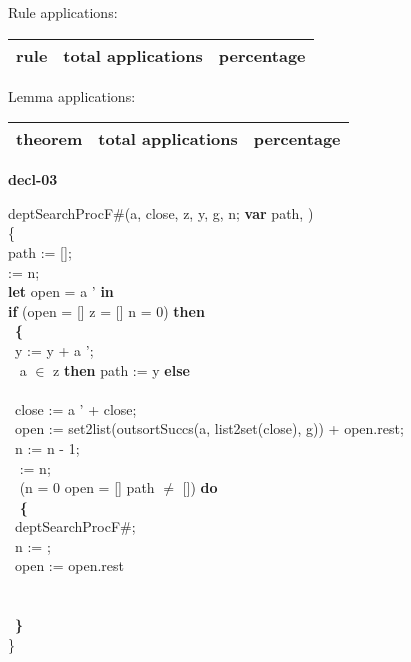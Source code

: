 \documentclass[a4paper]{article}
\begin{document}
Rule applications:

\begin{supertabular}{l|r|r}
rule	        & total applications & percentage \\ \hline

\end{supertabular}

Lemma applications:

\begin{supertabular}{l|r|r}
theorem	        & total applications & percentage \\ \hline

\end{supertabular}
\pagebreak

{\LARGE\bf decl-03}\label{lemma-decl-03}

\medskip

deptSearchProcF\#(a, close, z, y, g, n; {\bf var} path, ) \\
\{\\
path := [];\\
  := n;\\
 {\bf let} open = a ' {\bf in}\\
 {\bf if} \Not (open = [] \Or z = [] \Or n = 0) {\bf then}\\
 \tabif\  {\bf \{}\\
 \tabif\ \tabbe y := y + a ';\\
 \tabif\  a $\in$ z {\bf then} path := y {\bf else}\\
 \tabif\ \tabbe  {\bf \{}\\
 \tabif\ \tabbe \tabbe close := a ' + close;\\
 \tabif\ \tabbe \tabbe open := set2list(outsortSuccs(a, list2set(close), g)) + open.rest;\\
 \tabif\ \tabbe \tabbe n := n - 1;\\
 \tabif\ \tabbe \tabbe {} := n;\\
 \tabif\ \tabbe {} \Not (n = 0 \Or open = [] \Or path $\neq$ []) {\bf do}\\
 \tabif\ \tabbe \tabbe {} {\bf \{}\\
 \tabif\ \tabbe \tabbe {}\tabbe deptSearchProcF\#;\\
 \tabif\ \tabbe \tabbe {}\tabbe n := ;\\
 \tabif\ \tabbe \tabbe {}\tabbe open := open.rest\\
 \tabif\ \tabbe \tabbe {}\\
 \tabif\ \tabbe {\bf \}}\\
 \tabif\ {\bf \}}\\
\}
\end{document}
